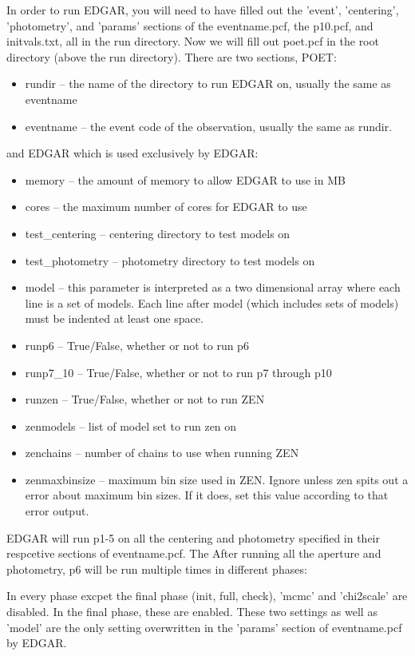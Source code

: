 \documentclass[letterpaper,12pt]{article}
\begin{document}
In order to run EDGAR, you will need to have filled out the 'event',
'centering', 'photometry', and 'params' sections of the eventname.pcf, the
p10.pcf, and initvals.txt, all in the run directory. Now we will fill
out poet.pcf in the root directory (above the run directory). There
are two sections, POET:
\begin{itemize}
\item rundir -- the name of the directory to run EDGAR on, usually the
  same as eventname
\item eventname -- the event code of the observation, usually the same
  as rundir.
\end{itemize}
and EDGAR which is used exclusively by EDGAR:
\begin{itemize}
\item memory -- the amount of memory to allow EDGAR to use in MB
\item cores -- the maximum number of cores for EDGAR to use
\item test\_centering -- centering directory to test models on
\item test\_photometry -- photometry directory to test models on
\item model -- this parameter is interpreted as a two dimensional
  array where each line is a set of models. Each line after model
  (which includes sets of models) must be indented at least one space.
\item runp6 -- True/False, whether or not to run p6
\item runp7\_10 -- True/False, whether or not to run p7 through p10
\item runzen -- True/False, whether or not to run ZEN
\item zenmodels -- list of model set to run zen on
\item zenchains -- number of chains to use when running ZEN
\item zenmaxbinsize -- maximum bin size used in ZEN. Ignore unless zen
  spits out a error about maximum bin sizes. If it does, set this
  value according to that error output.
\end{itemize}

EDGAR will run p1-5 on all the centering and photometry specified in
their respcetive sections of eventname.pcf. The After running all the
aperture and photometry, p6 will be run multiple times in different
phases:

In every phase excpet the final phase (init, full, check), 'mcmc' and
'chi2scale' are disabled. In the final phase, these are enabled. These
two settings as well as 'model' are the only setting overwritten in
the 'params' section of eventname.pcf by EDGAR.
\end{document}
